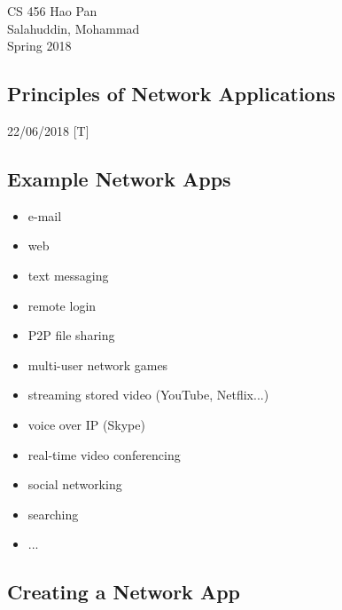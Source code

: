 \documentclass{article}
\begin{document}
\noindent
{CS 456 \hfill Hao Pan}\\
{Salahuddin, Mohammad}\\
{Spring 2018}


\begin{center}
\section{Principles of Network Applications}
\noindent
{\hfill 22/06/2018 [T]}
\end{center}

\subsection{Example Network Apps}

\begin{multicols}{2}
\begin{itemize}
\item e-mail
\item web
\item text messaging
\item remote login
\item P2P file sharing
\item multi-user network games
\columnbreak
\item streaming stored video (YouTube, Netflix...)
\item voice over IP (Skype)
\item real-time video conferencing
\item social networking
\item searching
\item ...
\end{itemize}
\end{multicols}

\subsection{Creating a Network App}
\end{document}
